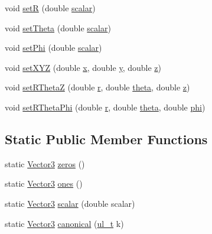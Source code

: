 \begin{DoxyCompactItemize}
\item 
void \mbox{\hyperlink{class_vector3_a9beef32ceaebce5bd595fd016e65be4f}{setR}} (double \mbox{\hyperlink{class_vector3_a9c6df044ff0f0b8e7809d3dbfa84407e}{scalar}})
\item 
void \mbox{\hyperlink{class_vector3_a55a6be6dca9ee66a9bfe497ac8a0c13f}{set\+Theta}} (double \mbox{\hyperlink{class_vector3_a9c6df044ff0f0b8e7809d3dbfa84407e}{scalar}})
\item 
void \mbox{\hyperlink{class_vector3_a6a5aa0401fbcc6cfcde68ba486153b16}{set\+Phi}} (double \mbox{\hyperlink{class_vector3_a9c6df044ff0f0b8e7809d3dbfa84407e}{scalar}})
\item 
void \mbox{\hyperlink{class_vector3_accc0a2a83b45ba13ba0bc9f238e6d103}{set\+X\+YZ}} (double \mbox{\hyperlink{class_vector3_a58680da7b1109919f9912cc8c5d4d54d}{x}}, double \mbox{\hyperlink{class_vector3_aa86961f470134f1c7ca3eec7a88ad069}{y}}, double \mbox{\hyperlink{class_vector3_aff9b42255ac1e08c52a5eda5a4513a48}{z}})
\item 
void \mbox{\hyperlink{class_vector3_ad92ad388f1fb1d35c4efbd53d2c00776}{set\+R\+ThetaZ}} (double \mbox{\hyperlink{class_vector3_acbf6dfc367121fd82a153c4593306145}{r}}, double \mbox{\hyperlink{class_vector3_a30c86ee94c98070b469a56fa4f7fde4f}{theta}}, double \mbox{\hyperlink{class_vector3_aff9b42255ac1e08c52a5eda5a4513a48}{z}})
\item 
void \mbox{\hyperlink{class_vector3_a8f5b7f22c561c335017ad3a76bcd1808}{set\+R\+Theta\+Phi}} (double \mbox{\hyperlink{class_vector3_acbf6dfc367121fd82a153c4593306145}{r}}, double \mbox{\hyperlink{class_vector3_a30c86ee94c98070b469a56fa4f7fde4f}{theta}}, double \mbox{\hyperlink{class_vector3_af04a3d08dae7f1ba36ee3feaf3bc8a4c}{phi}})
\end{DoxyCompactItemize}
\subsection*{Static Public Member Functions}
\begin{DoxyCompactItemize}
\item 
static \mbox{\hyperlink{class_vector3}{Vector3}} \mbox{\hyperlink{class_vector3_a2e44cab723edf5af6d32cb4ff1f6b55e}{zeros}} ()
\item 
static \mbox{\hyperlink{class_vector3}{Vector3}} \mbox{\hyperlink{class_vector3_aaf1dd90e7ff3988038434dc2416a342f}{ones}} ()
\item 
static \mbox{\hyperlink{class_vector3}{Vector3}} \mbox{\hyperlink{class_vector3_a9c6df044ff0f0b8e7809d3dbfa84407e}{scalar}} (double scalar)
\item 
static \mbox{\hyperlink{class_vector3}{Vector3}} \mbox{\hyperlink{class_vector3_ad4e477e53b06ae7db1b85bb5f59451d1}{canonical}} (\mbox{\hyperlink{typedef_8h_a1b140a2034db3f5dfe18a987745df43a}{ul\+\_\+t}} k)
\end{DoxyCompactItemize}
